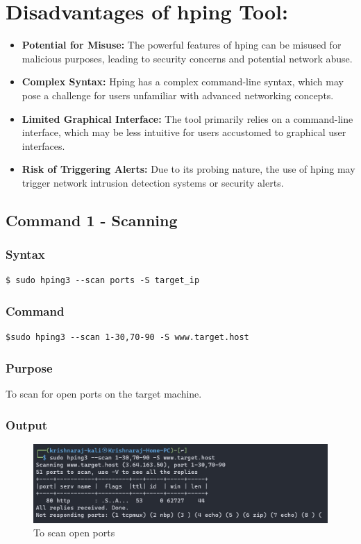 \documentclass[11pt]{article}
\begin{document}
\section*{Disadvantages of hping Tool:}
\begin{itemize}
    \item \textbf{Potential for Misuse:} The powerful features of hping can be misused for malicious purposes, leading to security concerns and potential network abuse.
    \item \textbf{Complex Syntax:} Hping has a complex command-line syntax, which may pose a challenge for users unfamiliar with advanced networking concepts.
    \item \textbf{Limited Graphical Interface:} The tool primarily relies on a command-line interface, which may be less intuitive for users accustomed to graphical user interfaces.
    \item \textbf{Risk of Triggering Alerts:} Due to its probing nature, the use of hping may trigger network intrusion detection systems or security alerts.
\end{itemize}

\subsection{Command 1 - Scanning}

\subsubsection*{Syntax}
\begin{verbatim}
$ sudo hping3 --scan ports -S target_ip
\end{verbatim}

\subsubsection*{Command}
\begin{verbatim}
$sudo hping3 --scan 1-30,70-90 -S www.target.host
\end{verbatim}

\subsubsection*{Purpose}
To scan for open ports on the target machine.

\subsubsection*{Output}
\begin{figure}[H]
    \centering
    \includegraphics[width=1.0\textwidth]{hping scan.jpg}
    \caption{To scan open ports}
    \label{fig:1}
\end{figure}
\end{document}
